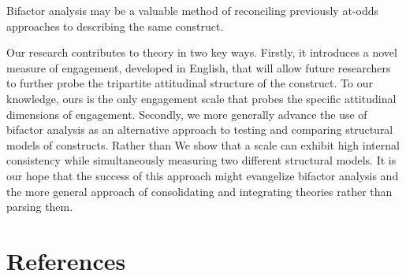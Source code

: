 \documentclass[
  english,
  man]{apa7}
\begin{document}
Bifactor analysis may be a valuable method of reconciling previously at-odds approaches to describing the same construct.

Our research contributes to theory in two key ways. Firstly, it introduces a novel measure of engagement, developed in English, that will allow future researchers to further probe the tripartite attitudinal structure of the construct. To our knowledge, ours is the only engagement scale that probes the specific attitudinal dimensions of engagement.
Secondly, we more generally advance the use of bifactor analysis as an alternative approach to testing and comparing structural models of constructs. Rather than
We show that a scale can exhibit high internal consistency while simultaneously measuring two different structural models.
It is our hope that the success of this approach might evangelize bifactor analysis and the more general approach of consolidating and integrating theories rather than parsing them.

\newpage

\hypertarget{references}{%
\section{References}\label{references}}

\begingroup
\setlength{\parindent}{-0.5in}
\setlength{\leftskip}{0.5in}
\end{document}
